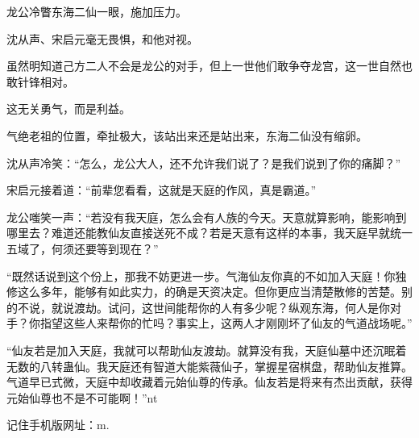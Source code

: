 \begin{this_body}
龙公冷瞥东海二仙一眼，施加压力。

沈从声、宋启元毫无畏惧，和他对视。

虽然明知道己方二人不会是龙公的对手，但上一世他们敢争夺龙宫，这一世自然也敢针锋相对。

这无关勇气，而是利益。

气绝老祖的位置，牵扯极大，该站出来还是站出来，东海二仙没有缩卵。

沈从声冷笑：“怎么，龙公大人，还不允许我们说了？是我们说到了你的痛脚？”

宋启元接着道：“前辈您看看，这就是天庭的作风，真是霸道。”

龙公嗤笑一声：“若没有我天庭，怎么会有人族的今天。天意就算影响，能影响到哪里去？难道还能教仙友直接送死不成？若是天意有这样的本事，我天庭早就统一五域了，何须还要等到现在？”

“既然话说到这个份上，那我不妨更进一步。气海仙友你真的不如加入天庭！你独修这么多年，能够有如此实力，的确是天资决定。但你更应当清楚散修的苦楚。别的不说，就说渡劫。试问，这世间能帮你的人有多少呢？纵观东海，何人是你对手？你指望这些人来帮你的忙吗？事实上，这两人才刚刚坏了仙友的气道战场呢。”

“仙友若是加入天庭，我就可以帮助仙友渡劫。就算没有我，天庭仙墓中还沉眠着无数的八转蛊仙。我天庭还有智道大能紫薇仙子，掌握星宿棋盘，帮助仙友推算。气道早已式微，天庭中却收藏着元始仙尊的传承。仙友若是将来有杰出贡献，获得元始仙尊也不是不可能啊！”nt

记住手机版网址：m.

\end{this_body}

